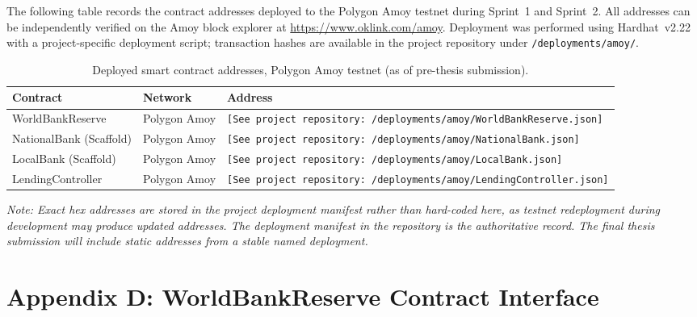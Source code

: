 \documentclass[12pt,a4paper]{report}
\newcommand{\tableheadcolor}{\rowcolor{black!8}}
\newcommand{\tableheadfont}{\bfseries\small}
\begin{document}
The following table records the contract addresses deployed to the Polygon Amoy testnet during Sprint~1 and Sprint~2. All addresses can be independently verified on the Amoy block explorer at \url{https://www.oklink.com/amoy}. Deployment was performed using Hardhat~v2.22 with a project-specific deployment script; transaction hashes are available in the project repository under \texttt{/deployments/amoy/}.

\begin{table}[H]
\centering
\caption{Deployed smart contract addresses, Polygon Amoy testnet (as of pre-thesis submission).}
\renewcommand{\arraystretch}{1.35}
\small
\begin{tabular}{@{}llp{5.5cm}@{}}
\toprule
\tableheadcolor
\tableheadfont Contract & \tableheadfont Network & \tableheadfont Address \\
\midrule
WorldBankReserve & Polygon Amoy & \texttt{[See project repository: /deployments/amoy/WorldBankReserve.json]} \\
\rowcolor{RowShade}
NationalBank (Scaffold) & Polygon Amoy & \texttt{[See project repository: /deployments/amoy/NationalBank.json]} \\
LocalBank (Scaffold) & Polygon Amoy & \texttt{[See project repository: /deployments/amoy/LocalBank.json]} \\
\rowcolor{RowShade}
LendingController & Polygon Amoy & \texttt{[See project repository: /deployments/amoy/LendingController.json]} \\
\bottomrule
\end{tabular}
\end{table}

\noindent\textit{Note: Exact hex addresses are stored in the project deployment manifest rather than hard-coded here, as testnet redeployment during development may produce updated addresses. The deployment manifest in the repository is the authoritative record. The final thesis submission will include static addresses from a stable named deployment.}

\chapter*{Appendix D: WorldBankReserve Contract Interface}
{}
\end{document}
